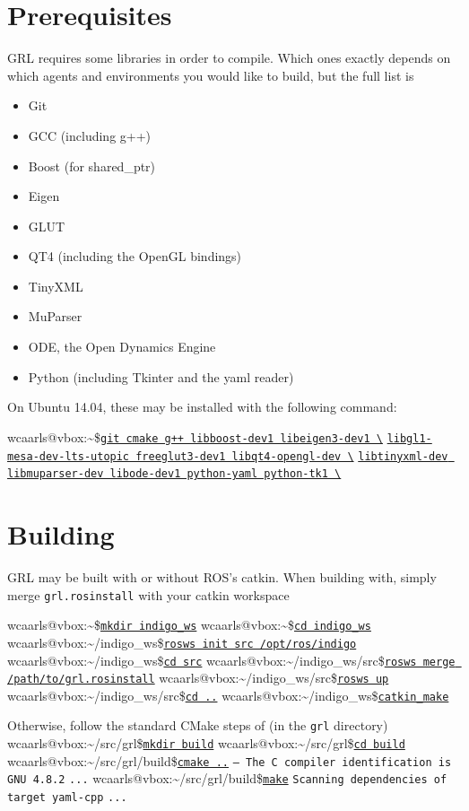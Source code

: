\documentclass{article}
\makeatletter
\newcommand{\inp}[1]{\texttt{\underline{#1}}}
\newcommand{\txt}[1]{\texttt{#1}}
\newcommand{\promptm}{wcaarls@vbox:\~{}/src/grl\$\xspace}
\newcommand{\promptmb}{wcaarls@vbox:\~{}/src/grl/build\$\xspace}
\newcommand{\prompt}{wcaarls@vbox:\~{}\$\xspace}
\newcommand{\prompth}{wcaarls@vbox:\~{}/indigo\_ws\$\xspace}
\newcommand{\prompths}{wcaarls@vbox:\~{}/indigo\_ws/src\$\xspace}
\newenvironment{code}{\alltt}{\endalltt}
\makeatother
\begin{document}
\section{Prerequisites}

GRL requires some libraries in order to compile. Which ones exactly depends
on which agents and environments you would like to build, but the full list
is

\begin{itemize}
  \item Git
  \item GCC (including g++)
  \item Boost (for shared\_ptr)
  \item Eigen
  \item GLUT
  \item QT4 (including the OpenGL bindings)
  \item TinyXML
  \item MuParser
  \item ODE, the Open Dynamics Engine
  \item Python (including Tkinter and the yaml reader)
\end{itemize}

On Ubuntu 14.04, these may be installed with the following command:

\begin{code}
\prompt \inp{git cmake g++ libboost-dev1 libeigen3-dev1 \textbackslash}
\inp{libgl1-mesa-dev-lts-utopic freeglut3-dev1 libqt4-opengl-dev \textbackslash}
\inp{libtinyxml-dev libmuparser-dev libode-dev1 python-yaml python-tk1 \textbackslash}
\end{code}

\section{Building}

GRL may be built with or without ROS's catkin. When building with, simply
merge \txt{grl.rosinstall} with your catkin workspace

\begin{code}
{\color{Gray}\prompt \inp{mkdir indigo\_ws}
\prompt \inp{cd indigo\_ws}
\prompth \inp{rosws init src /opt/ros/indigo}
\prompth \inp{cd src}}
\prompths \inp{rosws merge /path/to/grl.rosinstall} 
\prompths \inp{rosws up}
\prompths \inp{cd ..}
\prompth \inp{catkin\_make}
\end{code}

Otherwise, follow the standard CMake steps of (in the \txt{grl} directory)
\begin{code}
\promptm \inp{mkdir build}
\promptm \inp{cd build}
\promptmb \inp{cmake ..}
\txt{-- The C compiler identification is GNU 4.8.2}
\txt{...}
\promptmb \inp{make}
\txt{Scanning dependencies of target yaml-cpp}
\txt{...}
\end{code}
\end{document}
